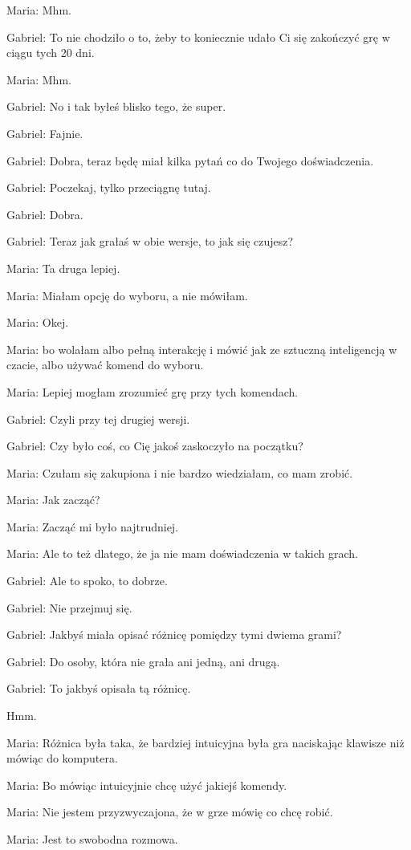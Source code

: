 Maria: Mhm.

Gabriel: To nie chodziło o to, żeby to koniecznie udało Ci się zakończyć grę w ciągu tych 20 dni.

Maria: Mhm.

Gabriel: No i tak byłeś blisko tego, że super.

Gabriel: Fajnie.

Gabriel: Dobra, teraz będę miał kilka pytań co do Twojego doświadczenia.

Gabriel: Poczekaj, tylko przeciągnę tutaj.

Gabriel: Dobra.

Gabriel: Teraz jak grałaś w obie wersje, to jak się czujesz?

Maria: Ta druga lepiej.

Maria: Miałam opcję do wyboru, a nie mówiłam.

Maria: Okej.

Maria: bo wolałam albo pełną interakcję i mówić jak ze sztuczną inteligencją w czacie, albo używać komend do wyboru.

Maria: Lepiej mogłam zrozumieć grę przy tych komendach.

Gabriel: Czyli przy tej drugiej wersji.

Gabriel: Czy było coś, co Cię jakoś zaskoczyło na początku?

Maria: Czułam się zakupiona i nie bardzo wiedziałam, co mam zrobić.

Maria: Jak zacząć?

Maria: Zacząć mi było najtrudniej.

Maria: Ale to też dlatego, że ja nie mam doświadczenia w takich grach.

Gabriel: Ale to spoko, to dobrze.

Gabriel: Nie przejmuj się.

Gabriel: Jakbyś miała opisać różnicę pomiędzy tymi dwiema grami?

Gabriel: Do osoby, która nie grała ani jedną, ani drugą.

Gabriel: To jakbyś opisała tą różnicę.

Hmm.

Maria: Różnica była taka, że bardziej intuicyjna była gra naciskając klawisze niż mówiąc do komputera.

Maria: Bo mówiąc intuicyjnie chcę użyć jakiejś komendy.

Maria: Nie jestem przyzwyczajona, że w grze mówię co chcę robić.

Maria: Jest to swobodna rozmowa.

